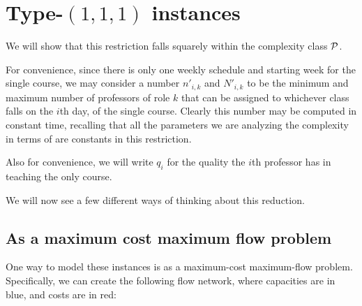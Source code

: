 \section{Type-$(1, 1, 1)$ instances}
We will show that this restriction falls squarely within the complexity class $\mathcal{P}$.

For convenience, since there is only one weekly schedule and starting week for the single course, we may consider a number $n'_{i, k}$ and $N'_{i, k}$ to be the minimum and maximum number of professors of role $k$ that can be assigned to whichever class falls on the $i$th day, of the single course. Clearly this number may be computed in constant time, recalling that all the parameters we are analyzing the complexity in terms of are constants in this restriction.

Also for convenience, we will write $q_i$ for the quality the $i$th professor has in teaching the only course.

We will now see a few different ways of thinking about this reduction.
\subsection{As a maximum cost maximum flow problem}

One way to model these instances is as a maximum-cost maximum-flow problem. Specifically, we can create the following flow network, where capacities are in blue, and costs are in red:

